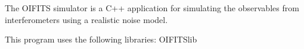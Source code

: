 The OIFITS simulator is a C++ application for simulating the observables from interferometers using a realistic noise model.

This program uses the following libraries: OIFITSlib 